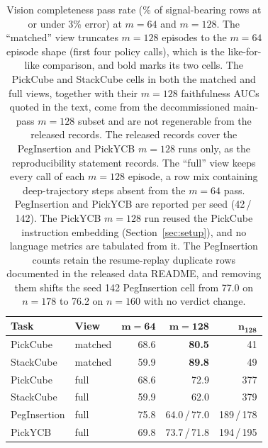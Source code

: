 \documentclass{article}
\begin{document}
\begin{table}[t!]
\centering
\footnotesize
\setlength{\tabcolsep}{4.5pt}
\begin{tabular}{@{}ll rrr@{}}
\toprule
\textbf{Task} & \textbf{View} & $\boldsymbol{m{=}64}$ & $\boldsymbol{m{=}128}$ & $\boldsymbol{n_{128}}$ \\
\midrule
PickCube & matched & 68.6 & \textbf{80.5} & 41 \\
StackCube & matched & 59.9 & \textbf{89.8} & 49 \\
\midrule
PickCube & full & 68.6 & 72.9 & 377 \\
StackCube & full & 59.9 & 62.0 & 379 \\
PegInsertion & full & 75.8 & 64.0\,/\,77.0 & 189\,/\,178 \\
PickYCB & full & 69.8 & 73.7\,/\,71.8 & 194\,/\,195 \\
\bottomrule
\end{tabular}
\caption{Vision completeness pass rate (\% of signal-bearing rows at or under 3\% error) at $m{=}64$ and $m{=}128$. The ``matched'' view truncates $m{=}128$ episodes to the $m{=}64$ episode shape (first four policy calls), which is the like-for-like comparison, and bold marks its two cells. The PickCube and StackCube cells in both the matched and full views, together with their $m{=}128$ faithfulness AUCs quoted in the text, come from the decommissioned main-pass $m{=}128$ subset and are not regenerable from the released records. The released records cover the PegInsertion and PickYCB $m{=}128$ runs only, as the reproducibility statement records. The ``full'' view keeps every call of each $m{=}128$ episode, a row mix containing deep-trajectory steps absent from the $m{=}64$ pass. PegInsertion and PickYCB are reported per seed (42\,/\,142). The PickYCB $m{=}128$ run reused the PickCube instruction embedding (Section~\ref{sec:setup}), and no language metrics are tabulated from it. The PegInsertion counts retain the resume-replay duplicate rows documented in the released data README, and removing them shifts the seed 142 PegInsertion cell from 77.0 on $n{=}178$ to 76.2 on $n{=}160$ with no verdict change.}
\label{tab:m128}
\end{table}
\end{document}
